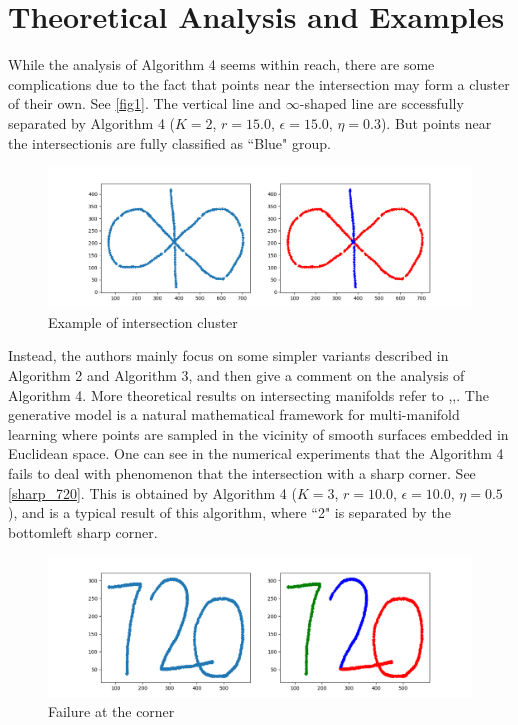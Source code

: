\documentclass[twoside,11pt]{article}
\begin{document}
\section{Theoretical Analysis and Examples}
While the analysis of Algorithm 4 seems within reach, there are some complications due to the fact that points near the intersection may form a cluster of their own.
See \autoref{fig1}.
The vertical line and $\infty$-shaped line are sccessfully separated by Algorithm 4 ($K = 2$, $r = 15.0$, $\epsilon = 15.0$, $\eta = 0.3$).
But points near the intersectionis are fully classified as ``Blue" group. 
\begin{figure}[htbp]
\centering
\vspace{-1em}
\includegraphics[width=0.9  \textwidth]{infinity_shape.png}
\vspace{-1em}
\caption{Example of intersection cluster}
\label{fig1}
\end{figure}

Instead, the authors mainly focus on some simpler variants described in Algorithm 2 and Algorithm 3, and then give a comment on the analysis of Algorithm 4.
More theoretical results on intersecting manifolds 
refer to \cite{arias2011},\cite{chen2009},\cite{soltanolkotabi2012}.
The generative model is a natural mathematical framework for multi-manifold learning where points are sampled in the vicinity of smooth surfaces embedded in Euclidean space.
One can see in the numerical experiments that the Algorithm 4 fails to deal with phenomenon that the intersection with a sharp corner.
See \autoref{sharp_720}. This is obtained by  Algorithm 4  ($K = 3$, $r = 10.0$, $\epsilon = 10.0$, $\eta = 0.5$), and is a typical result of this algorithm, where ``2" is separated by the bottomleft sharp corner.
\begin{figure}[htbp]
\centering
\vspace{-1em}
\includegraphics[width=0.9  \textwidth]{sharp_720.png}
\vspace{-1em}
\caption{Failure at the corner}
\label{sharp_720}
\end{figure}
\end{document}
